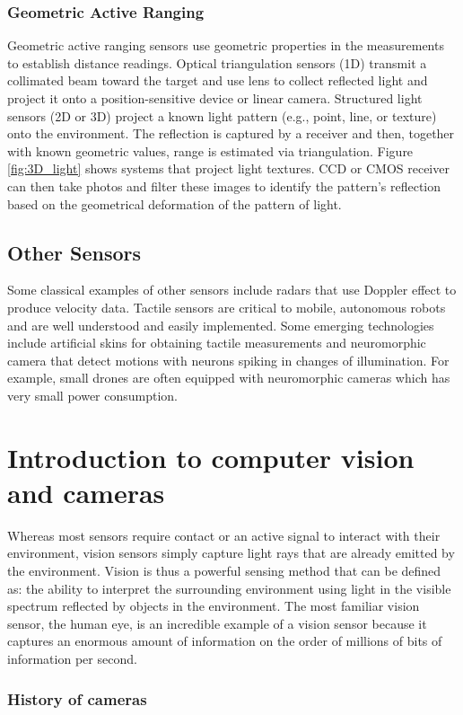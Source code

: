 \subsubsection{Geometric Active Ranging}
Geometric active ranging sensors use geometric properties in the measurements to establish distance readings. Optical triangulation sensors (1D) transmit a collimated beam toward the target and use lens to collect reflected light and project it onto a position-sensitive device or linear camera. Structured light sensors (2D or 3D) project a known light pattern (e.g., point, line, or texture) onto the environment. The reflection is captured by a receiver and then, together with known geometric values, range is estimated via triangulation. Figure \ref{fig:3D_light} shows systems that project light textures. CCD or CMOS receiver can then take photos and filter these images to identify the pattern’s reflection based on the geometrical deformation of the pattern of light. 
\subsection{Other Sensors}

Some classical examples of other sensors include radars that use Doppler effect to produce velocity data. Tactile sensors are critical to mobile, autonomous robots and are well understood and easily implemented. Some emerging technologies include artificial skins for obtaining tactile measurements and neuromorphic camera that detect motions with neurons spiking in changes of illumination. For example, small drones are often equipped with neuromorphic cameras which has very small power consumption.


\section{Introduction to computer vision and cameras}
Whereas most sensors require contact or an active signal to interact with their environment, vision sensors simply capture light rays that are already emitted by the environment. Vision is thus a powerful sensing method that can be defined as: the ability to interpret the surrounding environment using light in the visible spectrum reflected by objects in the environment. The most familiar vision sensor, the human eye, is an incredible example of a vision sensor because it captures an enormous amount of information on the order of millions of bits of information per second.

\subsubsection{History of cameras}

